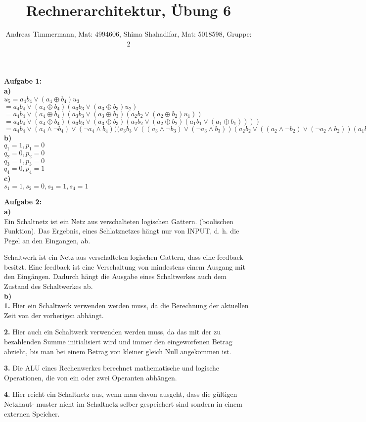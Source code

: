 \documentclass[a4paper]{scrartcl}
\title{Rechnerarchitektur, Übung 6}
\author{Andreas Timmermann, Mat: 4994606, Shima Shahadifar, Mat: 5018598, Gruppe: 2}
\begin{document}
	\maketitle
	\begin{flushleft}
		\textbf{Aufgabe 1:}\\
		\textbf{a)}\\
		$u_5=a_4 b_4 \vee (a_4\oplus b_4) u_3$\\
		$=a_4 b_4 \vee (a_4\oplus b_4) (a_3 b_3 \vee (a_3\oplus b_3) u_2)$
		$=a_4 b_4 \vee (a_4\oplus b_4) (a_3 b_3 \vee (a_3\oplus b_3) (a_2 b_2 \vee (a_2\oplus b_2) u_1))$
		$=a_4 b_4 \vee (a_4\oplus b_4) (a_3 b_3 \vee (a_3\oplus b_3) (a_2 b_2 \vee (a_2\oplus b_2) (a_1 b_1 \vee (a_1\oplus b_1))))$
		$=a_4 b_4 \vee (a_4\wedge \neg b_4)\vee (\neg a_4\wedge b_4)) (a_3 b_3 \vee ((a_3\wedge\neg b_3)\vee(\neg a_3\wedge b_3)) (a_2 b_2 \vee ((a_2\wedge\neg b_2)\vee(\neg a_2\wedge b_2)) (a_1 b_1 \vee ((a_1\wedge\neg b_1)\vee(\neg a_1\wedge b_1))))$\\[1em]
		\textbf{b)}\\
		$q_1=1, p_1=0$\\
		$q_2=0, p_2=0$\\
		$q_3=1, p_3=0$\\
		$q_4=0, p_4=1$\\
		\textbf{c)}\\
		$s_1 = 1,s_2 = 0,s_3 = 1,s_4 = 1$\\
	\end{flushleft}
	\begin{flushleft}
		\textbf{Aufgabe 2:}\\
\textbf{a)}\\

Ein Schaltnetz ist ein Netz aus verschalteten logischen Gattern. (boolischen Funktion). Das Ergebnis, eines Schlatznetzes hängt nur von INPUT, d. h. die Pegel an den Eingangen, ab.

Schaltwerk ist ein Netz aus verschalteten logischen Gattern, dass eine feedback besitzt. Eine feedback ist eine Verschaltung von mindestens einem Ausgang mit den Eingängen. Dadurch hängt die Ausgabe eines Schaltwerkes auch dem Zustand des Schaltwerkes ab.\\[1em]

\textbf{b)}\\

\textbf{1.} Hier ein Schaltwerk verwenden werden muss, da die Berechnung der aktuellen Zeit von der vorherigen abhängt.

\textbf{2.} Hier auch ein Schaltwerk verwenden werden muss, da das mit der zu bezahlenden Summe initialisiert wird und immer den eingeworfenen Betrag abzieht, bis man bei einem Betrag von kleiner gleich Null angekommen ist.

\textbf{3.} Die ALU eines Rechenwerkes berechnet mathematische und logische Operationen, die von ein oder zwei Operanten abhängen.

\textbf{4.} Hier reicht ein Schaltnetz aus, wenn man davon ausgeht, dass die gültigen Netzhaut- muster nicht im Schaltnetz selber gespeichert sind sondern in einem externen Speicher. 
	\end{flushleft}
\end{document}
